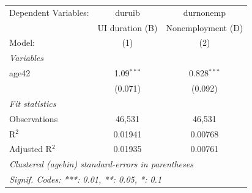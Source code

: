 
\begingroup
\centering
\begin{tabular}{lcc}
   \tabularnewline \midrule \midrule
   Dependent Variables: & duruib          & durnonemp\\  
                        & UI duration (B) & Nonemployment (D) \\   
   Model:               & (1)             & (2)\\  
   \midrule
   \emph{Variables}\\
   age42                & 1.09$^{***}$    & 0.828$^{***}$\\   
                        & (0.071)         & (0.092)\\   
   \midrule
   \emph{Fit statistics}\\
   Observations         & 46,531          & 46,531\\  
   R$^2$                & 0.01941         & 0.00768\\  
   Adjusted R$^2$       & 0.01935         & 0.00761\\  
   \midrule \midrule
   \multicolumn{3}{l}{\emph{Clustered (agebin) standard-errors in parentheses}}\\
   \multicolumn{3}{l}{\emph{Signif. Codes: ***: 0.01, **: 0.05, *: 0.1}}\\
\end{tabular}
\par\endgroup



